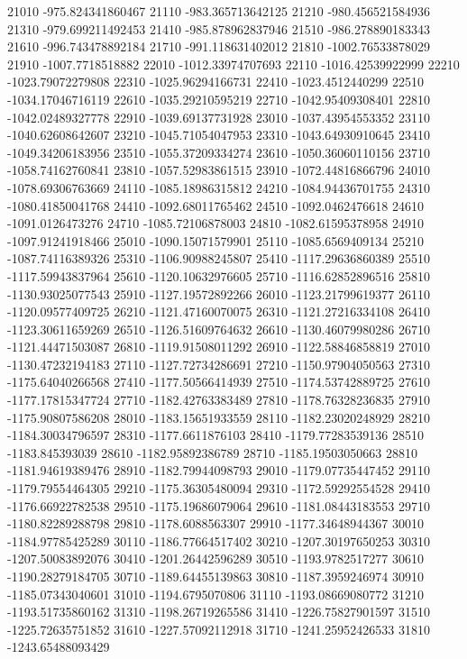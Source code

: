 {21010 -975.824341860467
21110 -983.365713642125
21210 -980.456521584936
21310 -979.699211492453
21410 -985.878962837946
21510 -986.278890183343
21610 -996.743478892184
21710 -991.118631402012
21810 -1002.76533878029
21910 -1007.7718518882
22010 -1012.33974707693
22110 -1016.42539922999
22210 -1023.79072279808
22310 -1025.96294166731
22410 -1023.4512440299
22510 -1034.17046716119
22610 -1035.29210595219
22710 -1042.95409308401
22810 -1042.02489327778
22910 -1039.69137731928
23010 -1037.43954553352
23110 -1040.62608642607
23210 -1045.71054047953
23310 -1043.64930910645
23410 -1049.34206183956
23510 -1055.37209334274
23610 -1050.36060110156
23710 -1058.74162760841
23810 -1057.52983861515
23910 -1072.44816866796
24010 -1078.69306763669
24110 -1085.18986315812
24210 -1084.94436701755
24310 -1080.41850041768
24410 -1092.68011765462
24510 -1092.0462476618
24610 -1091.0126473276
24710 -1085.72106878003
24810 -1082.61595378958
24910 -1097.91241918466
25010 -1090.15071579901
25110 -1085.6569409134
25210 -1087.74116389326
25310 -1106.90988245807
25410 -1117.29636860389
25510 -1117.59943837964
25610 -1120.10632976605
25710 -1116.62852896516
25810 -1130.93025077543
25910 -1127.19572892266
26010 -1123.21799619377
26110 -1120.09577409725
26210 -1121.47160070075
26310 -1121.27216334108
26410 -1123.30611659269
26510 -1126.51609764632
26610 -1130.46079980286
26710 -1121.44471503087
26810 -1119.91508011292
26910 -1122.58846858819
27010 -1130.47232194183
27110 -1127.72734286691
27210 -1150.97904050563
27310 -1175.64040266568
27410 -1177.50566414939
27510 -1174.53742889725
27610 -1177.17815347724
27710 -1182.42763383489
27810 -1178.76328236835
27910 -1175.90807586208
28010 -1183.15651933559
28110 -1182.23020248929
28210 -1184.30034796597
28310 -1177.6611876103
28410 -1179.77283539136
28510 -1183.845393039
28610 -1182.95892386789
28710 -1185.19503050663
28810 -1181.94619389476
28910 -1182.79944098793
29010 -1179.07735447452
29110 -1179.79554464305
29210 -1175.36305480094
29310 -1172.59292554528
29410 -1176.66922782538
29510 -1175.19686079064
29610 -1181.08443183553
29710 -1180.82289288798
29810 -1178.6088563307
29910 -1177.34648944367
30010 -1184.97785425289
30110 -1186.77664517402
30210 -1207.30197650253
30310 -1207.50083892076
30410 -1201.26442596289
30510 -1193.9782517277
30610 -1190.28279184705
30710 -1189.64455139863
30810 -1187.3959246974
30910 -1185.07343040601
31010 -1194.6795070806
31110 -1193.08669080772
31210 -1193.51735860162
31310 -1198.26719265586
31410 -1226.75827901597
31510 -1225.72635751852
31610 -1227.57092112918
31710 -1241.25952426533
31810 -1243.65488093429
}
